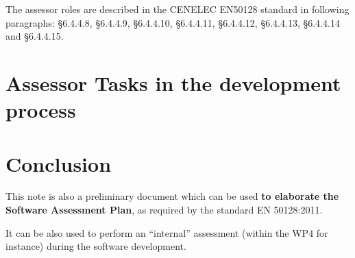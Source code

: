 \documentclass{template/openetcs_report}
\begin{document}
The assessor roles are described in the CENELEC EN50128 standard in following paragraphs: \S6.4.4.8, \S6.4.4.9, \S6.4.4.10, \S6.4.4.11, \S6.4.4.12, \S6.4.4.13, \S6.4.4.14 and \S6.4.4.15.

\chapter{Assessor Tasks in the development process}



\chapter{Conclusion}
This note is also a preliminary document which can be used {\bfseries to elaborate the Software Assessment Plan}, as required by the standard EN 50128:2011.

It can be also used to perform an “internal” assessment (within the WP4 for instance) during the software development.



\end{document}
